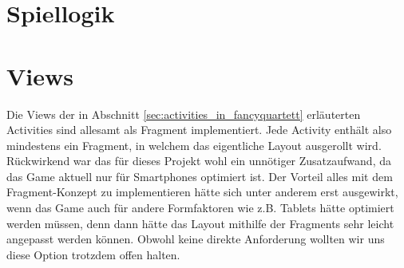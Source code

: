 \section{Spiellogik}


\section{Views}
Die Views der in Abschnitt \ref{sec:activities_in_fancyquartett} erläuterten Activities sind allesamt als Fragment implementiert. Jede Activity enthält also mindestens ein Fragment, in welchem das eigentliche Layout ausgerollt wird. Rückwirkend war das für dieses Projekt wohl ein unnötiger Zusatzaufwand, da das Game aktuell nur für Smartphones optimiert ist. Der Vorteil alles mit dem Fragment-Konzept zu implementieren hätte sich unter anderem erst ausgewirkt, wenn das Game auch für andere Formfaktoren wie z.B. Tablets hätte optimiert werden müssen, denn dann hätte das Layout mithilfe der Fragments sehr leicht angepasst werden können. Obwohl keine direkte Anforderung wollten wir uns diese Option trotzdem offen halten.




